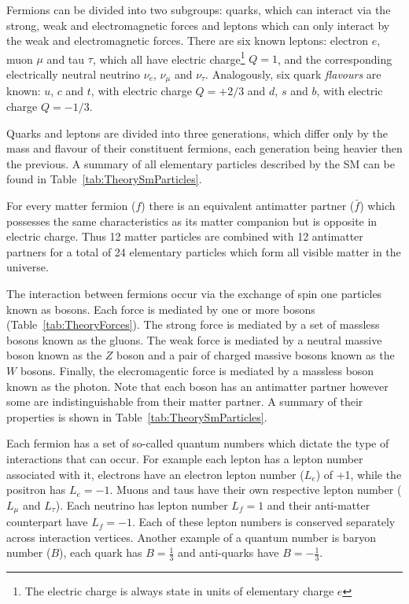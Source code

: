 Fermions can be divided into two subgroups: quarks, which can interact via the strong, weak and electromagnetic forces and leptons which can only interact by the weak and electromagnetic forces. There are six known leptons: electron $e$, muon $\mu$ and tau $\tau$, which all have electric charge\footnote{The electric charge is always state in units of elementary charge $e$} $Q=1$, and the corresponding electrically neutral neutrino $\nu_e$, $\nu_\mu$ and $\nu_{\tau}$. Analogously, six quark \textit{flavours} are known: $u$, $c$ and $t$, with electric charge $Q=+2/3$ and $d$, $s$ and $b$, with electric charge $Q=-1/3$.

Quarks and leptons are divided into three generations, which differ only by the mass and flavour of their constituent fermions, each generation being heavier then the previous. A summary of all elementary particles described by the SM can be found in Table~\ref{tab:TheorySmParticles}.

For every matter fermion ($f$) there is an equivalent antimatter partner ($\bar{f}$) which possesses the same characteristics as its matter companion but is opposite in electric charge. Thus 12 matter particles are combined with 12 antimatter partners for a total of 24 elementary particles which form all visible matter in the universe.

The interaction between fermions occur via the exchange of spin one particles known as bosons. Each force is mediated by one or more bosons (Table~\ref{tab:TheoryForces}). The strong force is mediated by a set of massless bosons known as the gluons. The weak force is mediated by a neutral massive boson known as the $Z$ boson and a pair of charged massive bosons known as the $W$ bosons. Finally, the elecromagentic force is mediated by a massless boson known as the photon. Note that each boson has an antimatter partner however some are indistinguishable from their matter partner. A summary of their properties is shown in Table~\ref{tab:TheorySmParticles}.

Each fermion has a set of so-called quantum numbers which dictate the type of interactions that can occur. For example each lepton has a lepton number associated with it, electrons have an electron lepton number ($L_e$) of +1, while the positron has $L_e=-1$. Muons and taus have their own respective lepton number ($L_{\mu}$ and $L_{\tau}$). Each neutrino has lepton number $L_{f}=1$ and their anti-matter counterpart have $L_f=-1$. Each of these lepton numbers is conserved separately across interaction vertices. Another example of a quantum number is baryon number ($B$), each quark has $B=\frac{1}{3}$ and anti-quarks have $B=-\frac{1}{3}$.

